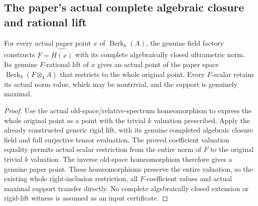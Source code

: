 \subsection{The paper's actual complete algebraic closure and rational lift}
\label{subsec:paper-rigid-lifts}

\begin{theorem}
\label{spectrum:paper-rigid-complete-extension}
\leanok
{}
For every actual paper point $x$ of $\operatorname{Berk}_k(A)$, the
genuine field factory constructs $F=\widehat{\overline{H(x)}}$ with its
complete algebraically closed ultrametric norm. Its genuine $F$-rational
lift of $x$ gives an actual point of the paper space
$\operatorname{Berk}_k(F\otimes_kA)$ that restricts to the whole original
point. Every $F$-scalar retains its actual norm value, which may be
nontrivial, and the support is genuinely maximal.
\end{theorem}
\begin{proof}
Use the actual old-space/relative-spectrum homeomorphism to express the
whole original point as a point with the trivial $k$ valuation prescribed.
Apply the already constructed generic rigid lift, with its genuine
completed algebraic closure field and full surjective tensor evaluation.
The proved coefficient valuation equality permits actual scalar restriction
from the entire norm of $F$ to the original trivial $k$ valuation. The
inverse old-space homeomorphism therefore gives a genuine paper point.
These homeomorphisms preserve the entire valuation, so the existing
whole right-inclusion restriction, all $F$-coefficient values and actual
maximal support transfer directly. No complete algebraically closed
extension or rigid-lift witness is assumed as an input certificate.
\end{proof}

